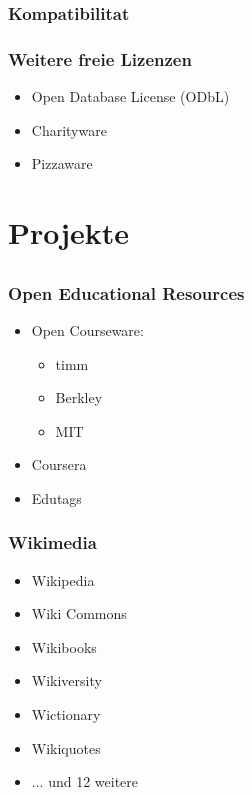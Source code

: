\documentclass{beamer}
\begin{document}
\begin{frame}
    \frametitle{Kompatibilitat}
\end{frame}

\begin{frame}
    \frametitle{Weitere freie Lizenzen}
    \begin{itemize}
        \item<2-> Open Database License (ODbL)
        \item<3-> Charityware
        \item<4-> Pizzaware
    \end{itemize}
\end{frame}

\section{Projekte}
\subsection{}

\begin{frame}
    \frametitle{Open Educational Resources}
    \begin{itemize}
      \item<2-> Open Courseware:
      \begin{itemize}
        \item<3-> timm
        \item<4-> Berkley
        \item<5-> MIT
      \end{itemize}
      \item<5-> Coursera
      \item<6-> Edutags
    \end{itemize}
\end{frame}

\begin{frame}
    \frametitle{Wikimedia}
    \begin{itemize}
      \item<2-> Wikipedia
      \item<3-> Wiki Commons
      \item<4-> Wikibooks
      \item<5-> Wikiversity
      \item<6-> Wictionary
      \item<7-> Wikiquotes
      \item<8-> ... und 12 weitere
    \end{itemize}
\end{frame}
\end{document}
